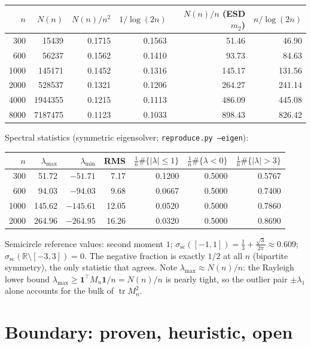 \documentclass[11pt]{article}
\begin{document}
\begin{center}
\begin{tabular}{rrrrrr}
\toprule
$n$ & $N(n)$ & $N(n)/n^2$ & $1/\log(2n)$ & $N(n)/n$ (ESD $m_2$) & $n/\log(2n)$\\
\midrule
300 & 15439 & 0.1715 & 0.1563 & 51.46 & 46.90\\
600 & 56237 & 0.1562 & 0.1410 & 93.73 & 84.63\\
1000 & 145171 & 0.1452 & 0.1316 & 145.17 & 131.56\\
2000 & 528537 & 0.1321 & 0.1206 & 264.27 & 241.14\\
4000 & 1944355 & 0.1215 & 0.1113 & 486.09 & 445.08\\
8000 & 7187475 & 0.1123 & 0.1033 & 898.43 & 826.42\\
\bottomrule
\end{tabular}
\end{center}

Spectral statistics (symmetric eigensolver; \texttt{reproduce.py --eigen}):

\begin{center}
\begin{tabular}{rrrrrrr}
\toprule
$n$ & $\lambda_{\max}$ & $\lambda_{\min}$ & RMS & $\tfrac1n\#\{|\lambda|\le1\}$ &
$\tfrac1n\#\{\lambda<0\}$ & $\tfrac1n\#\{|\lambda|>3\}$\\
\midrule
300 & 51.72 & $-51.71$ & 7.17 & 0.1200 & 0.5000 & 0.5767\\
600 & 94.03 & $-94.03$ & 9.68 & 0.0667 & 0.5000 & 0.7400\\
1000 & 145.62 & $-145.61$ & 12.05 & 0.0520 & 0.5000 & 0.7860\\
2000 & 264.96 & $-264.95$ & 16.26 & 0.0320 & 0.5000 & 0.8690\\
\bottomrule
\end{tabular}
\end{center}

Semicircle reference values: second moment $1$;
$\sigma_{\mathrm{sc}}([-1,1])=\tfrac13+\tfrac{\sqrt3}{2\pi}\approx0.609$;
$\sigma_{\mathrm{sc}}(\mathbb R\setminus[-3,3])=0$. The negative fraction is exactly
$1/2$ at all $n$ (bipartite symmetry), the only statistic that agrees. Note
$\lambda_{\max}\approx N(n)/n$: the Rayleigh lower bound
$\lambda_{\max}\ge\mathbf 1^{\!\top}M_n\mathbf 1/n=N(n)/n$ is nearly tight, so the
outlier pair $\pm\lambda_1$ alone accounts for the bulk of $\operatorname{tr}M_n^2$.

\section{Boundary: proven, heuristic, open}
\end{document}
